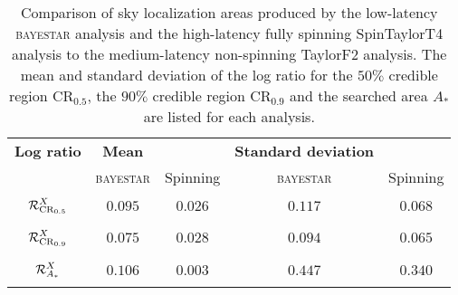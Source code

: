 \begin{table}
\begin{tabular}{ccccc}
\textbf{Log ratio} & \textbf{Mean} & & \textbf{Standard deviation} & \\   
 & \textsc{bayestar} & Spinning & \textsc{bayestar} & Spinning \\
$\displaystyle \vphantom{\frac{0}{0}} \mathcal{R}^X_{\mathrm{CR}_{0.5}}$ & $0.095$ & $0.026$ & $0.117$ & $0.068$ \\
$\displaystyle \vphantom{\frac{0}{0}} \mathcal{R}^X_{\mathrm{CR}_{0.9}}$ & $0.075$ & $0.028$ & $0.094$ & $0.065$ \\
$\displaystyle \vphantom{\frac{0}{0}} \mathcal{R}^X_{A_\ast}$ & $0.106$ & $0.003$ & $0.447$ & $0.340$
\end{tabular}
\caption{\label{tab:sky-ratio} Comparison of sky localization areas produced by the low-latency \textsc{bayestar} analysis and the high-latency fully spinning SpinTaylorT4 analysis to the medium-latency non-spinning TaylorF2 analysis. The mean and standard deviation of the log ratio for the $50\%$ credible region $\mathrm{CR}_{0.5}$, the $90\%$ credible region $\mathrm{CR}_{0.9}$ and the searched area $A_\ast$ are listed for each analysis.}

\end{table}